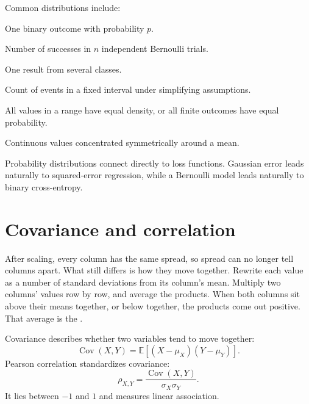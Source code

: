 Common distributions include:

\begin{description}[leftmargin=1.25in,style=nextline]
  \item[Bernoulli] One binary outcome with probability $p$.
  \item[Binomial] Number of successes in $n$ independent Bernoulli trials.
  \item[Categorical] One result from several classes.
  \item[Poisson] Count of events in a fixed interval under simplifying assumptions.
  \item[Uniform] All values in a range have equal density, or all finite outcomes have equal probability.
  \item[Normal] Continuous values concentrated symmetrically around a mean.
\end{description}

Probability distributions connect directly to loss functions. Gaussian error leads naturally to squared-error regression, while a Bernoulli model leads naturally to binary cross-entropy.

\section{Covariance and correlation}
\label{sec:correlation}

After scaling, every column has the same spread, so spread can no longer tell columns apart. What still differs is how they move together. Rewrite each value as a number of standard deviations from its column's mean. Multiply two columns' values row by row, and average the products. When both columns sit above their means together, or below together, the products come out positive. That average is the .

Covariance describes whether two variables tend to move together:
\[
  \operatorname{Cov}(X,Y)=\mathbb{E}[(X-\mu_X)(Y-\mu_Y)].
\]
Pearson correlation standardizes covariance:
\[
  \rho_{X,Y}=\frac{\operatorname{Cov}(X,Y)}{\sigma_X\sigma_Y}.
\]
It lies between $-1$ and $1$ and measures linear association.

